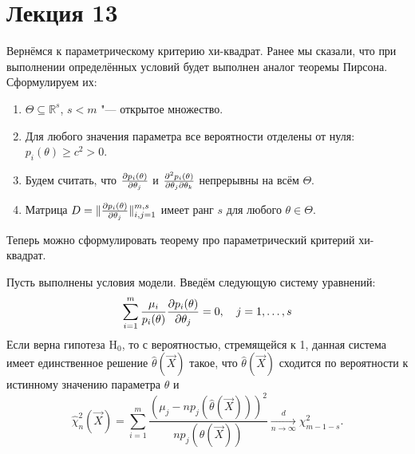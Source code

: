 
\section{Лекция 13}
Вернёмся к параметрическому критерию хи-квадрат. Ранее мы сказали, что при выполнении определённых условий будет выполнен аналог теоремы Пирсона. Сформулируем их:
\begin{enumerate}[label=\alph*)]
	\item $\Theta \subseteq \mathbb{R}^{s}$, $s < m$ "--- открытое множество.
	\item Для любого значения параметра все вероятности отделены от нуля: $p_{i}(\theta) \geq c^{2} > 0$.
	\item Будем считать, что $\pdv{p_{i}(\theta)}{\theta_{j}}$ и $\pdv[2]{p_{i}(\theta)}{\theta_{j}}{\theta_{k}}$ непрерывны на всём $\Theta$.
	\item Матрица $D = \|\pdv{p_{i}(\theta)}{\theta_{j}}\|_{i, j = 1}^{m, s}$ имеет ранг $s$ для любого $\theta \in \Theta$.
\end{enumerate}
Теперь можно сформулировать теорему про параметрический критерий хи-квадрат.
\begin{theorem}
	Пусть выполнены условия модели. Введём следующую систему уравнений:
	\begin{equation}
		\sum_{i = 1}^{m} \frac{\mu_{i}}{p_{i}(\theta)}\pdv{p_{i}(\theta)}{\theta_{j}} = 0, \quad j = 1, \ldots, s
	\end{equation}
	Если верна гипотеза $\mathrm{H}_{0}$, то с вероятностью, стремящейся к 1, данная система имеет единственное решение $\hat{\theta}(\vec{X})$ такое, что $\hat{\theta}(\vec{X})$ сходится по вероятности к истинному значению параметра $\theta$ и
	\begin{equation}
		\hat{\chi}^{2}_{n}(\vec{X}) = \sum_{i = 1}^{m} \frac{(\mu_{j} - np_{j}(\hat{\theta}(\vec{X})))^{2}}{np_{j}(\hat{\theta}(\vec{X}))} \xrightarrow[n \to \infty]{d} \chi^{2}_{m - 1 - s}.
	\end{equation}
\end{theorem}	
